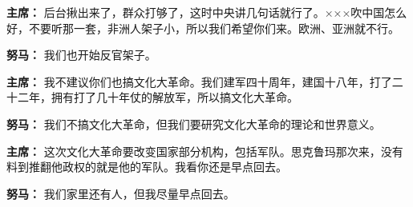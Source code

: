 \begin{duihua}
\item[\textbf{主席：}] 后台揪出来了，群众打够了，这时中央讲几句话就行了。×××吹中国怎么好，不要听那一套，非洲人架子小，所以我们希望你们来。欧洲、亚洲就不行。

\item[\textbf{努马：}] 我们也开始反官架子。

\item[\textbf{主席：}] 我不建议你们也搞文化大革命。我们建军四十周年，建国十八年，打了二十二年，拥有打了几十年仗的解放军，所以搞文化大革命。

\item[\textbf{努马：}] 我们不搞文化大革命，但我们要研究文化大革命的理论和世界意义。

\item[\textbf{主席：}] 这次文化大革命要改变国家部分机构，包括军队。思克鲁玛那次来，没有料到推翻他政权的就是他的军队。我看你还是早点回去。

\item[\textbf{努马：}] 我们家里还有人，但我尽量早点回去。
\end{duihua}
